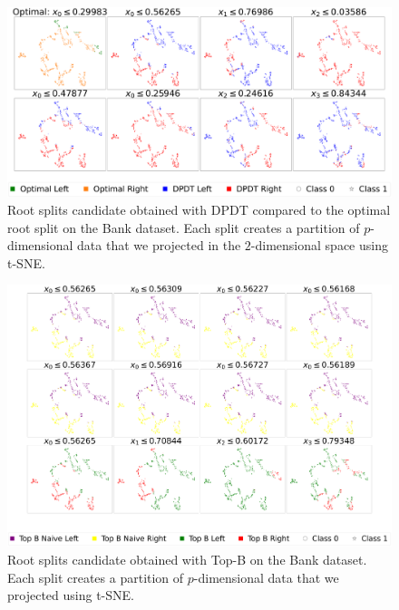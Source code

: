 \begin{figure}
    \centering
    \includegraphics[width=1\linewidth]{images/figures/splits_tsne_combined.pdf}
    \caption{Root splits candidate obtained with DPDT compared to the optimal root split on the Bank dataset. Each split creates a partition of $p$-dimensional data that we projected in the $2$-dimensional space using t-SNE.}
    \label{fig:splits_dpdt}
\end{figure}
\begin{figure}
    \centering
    \includegraphics[width=1\linewidth]{images/figures/splits_tsne_combined_topk.pdf}
    \caption{Root splits candidate obtained with Top-B\cite{topk} on the Bank dataset. Each split creates a partition of $p$-dimensional data that we projected using t-SNE.}
    \label{fig:splits_topb}
\end{figure}


